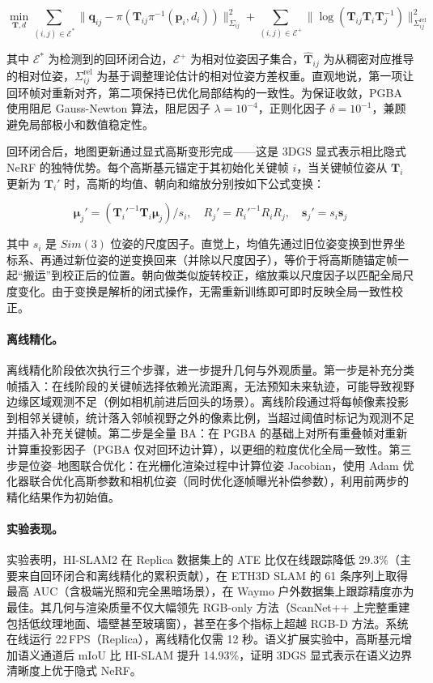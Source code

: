\begin{equation}
\min_{\mathbf{T}, d} \sum_{(i,j) \in \mathcal{E}^*} \| \mathbf{q}_{ij} - \pi(\mathbf{T}_{ij} \pi^{-1}(\mathbf{p}_i, d_i)) \|_{\Sigma_{ij}}^2 + \sum_{(i,j) \in \mathcal{E}^+} \| \log(\hat{\mathbf{T}}_{ij} \mathbf{T}_i \mathbf{T}_j^{-1}) \|_{\Sigma^{\mathrm{rel}}_{ij}}^2
\end{equation}

其中 $\mathcal{E}^*$ 为检测到的回环闭合边，$\mathcal{E}^+$ 为相对位姿因子集合，$\hat{\mathbf{T}}_{ij}$ 为从稠密对应推导的相对位姿，$\Sigma^{\mathrm{rel}}_{ij}$ 为基于调整理论估计的相对位姿方差权重。直观地说，第一项让回环帧对重新对齐，第二项保持已优化局部结构的一致性。为保证收敛，PGBA 使用阻尼 Gauss-Newton 算法，阻尼因子 $\lambda = 10^{-4}$，正则化因子 $\delta = 10^{-1}$，兼顾避免局部极小和数值稳定性。

回环闭合后，地图更新通过显式高斯变形完成——这是 3DGS 显式表示相比隐式 NeRF 的独特优势。每个高斯基元锚定于其初始化关键帧 $i$，当关键帧位姿从 $\mathbf{T}_i$ 更新为 $\mathbf{T}_i'$ 时，高斯的均值、朝向和缩放分别按如下公式变换：

\begin{equation}
\boldsymbol{\mu}_j' = (\mathbf{T}_i'^{-1} \mathbf{T}_i \boldsymbol{\mu}_j) / s_i, \quad R_j' = R_i'^{-1} R_i R_j, \quad \mathbf{s}_j' = s_i \mathbf{s}_j
\end{equation}

其中 $s_i$ 是 $Sim(3)$ 位姿的尺度因子。直觉上，均值先通过旧位姿变换到世界坐标系、再通过新位姿的逆变换回来（并除以尺度因子），等价于将高斯随锚定帧一起``搬运''到校正后的位置。朝向做类似旋转校正，缩放乘以尺度因子以匹配全局尺度变化。由于变换是解析的闭式操作，无需重新训练即可即时反映全局一致性校正。

\paragraph{离线精化。}
离线精化阶段依次执行三个步骤，进一步提升几何与外观质量。第一步是补充分类帧插入：在线阶段的关键帧选择依赖光流距离，无法预知未来轨迹，可能导致视野边缘区域观测不足（例如相机前进后回头的场景）。离线阶段通过将每帧像素投影到相邻关键帧，统计落入邻帧视野之外的像素比例，当超过阈值时标记为观测不足并插入补充关键帧。第二步是全量 BA：在 PGBA 的基础上对所有重叠帧对重新计算重投影因子（PGBA 仅对回环边计算），以更细的粒度优化全局一致性。第三步是位姿--地图联合优化：在光栅化渲染过程中计算位姿 Jacobian，使用 Adam 优化器联合优化高斯参数和相机位姿（同时优化逐帧曝光补偿参数），利用前两步的精化结果作为初始值。

\paragraph{实验表现。}
实验表明，HI-SLAM2 在 Replica 数据集上的 ATE 比仅在线跟踪降低 29.3\%（主要来自回环闭合和离线精化的累积贡献），在 ETH3D SLAM 的 61 条序列上取得最高 AUC（含极端光照和完全黑暗场景），在 Waymo 户外数据集上跟踪精度亦为最佳。其几何与渲染质量不仅大幅领先 RGB-only 方法（ScanNet++ 上完整重建包括低纹理地面、墙壁甚至玻璃窗），甚至在多个指标上超越 RGB-D 方法。系统在线运行 22\,FPS（Replica），离线精化仅需 12 秒。语义扩展实验中，高斯基元增加语义通道后 mIoU 比 HI-SLAM 提升 14.93\%，证明 3DGS 显式表示在语义边界清晰度上优于隐式 NeRF。

